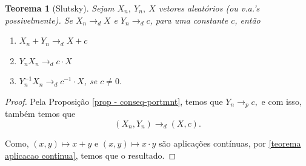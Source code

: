 \documentclass[12pt,a4paper,oneside]{book}
\newtheorem{theorem}{Teorema}[section]
\theoremstyle{definition}
\theoremstyle{remark}
\numberwithin{equation}{section}
\newcommand{\e}{\varepsilon}
\newcommand{\pr}{\mathbb{P}}
\begin{document}

\begin{tcolorbox}

\begin{theorem}[Slutsky]\label{teorema-slutsky} Sejam $X_n,\ Y_n,\ X$ vetores aleatórios (ou v.a.'s possivelmente). Se $X_n \rightarrow_d X$ e $Y_n\rightarrow_d c$, para uma constante $c$, então
\begin{enumerate}
\item $X_n+Y_n \rightarrow_d X+c$
\item $Y_n X_n \rightarrow_d c\cdot X$
\item $Y_n^{-1}X_n \rightarrow_d c^{-1}\cdot X$, se $c\neq 0.$

\end{enumerate} 

\end{theorem}

\end{tcolorbox}


\begin{proof}
Pela Proposição \ref{prop - conseq-portmnt}, temos que $Y_n \rightarrow_p c,$ e com isso, também temos que 
$$(X_n,Y_n) \rightarrow_d (X,c). $$

Como, $(x,y)\mapsto x+  y$ e   $(x,y)\mapsto x\cdot y$ são aplicações contínuas, por \ref{teorema aplicacao continua}, temos que o resultado. 
\end{proof}
\end{document}
